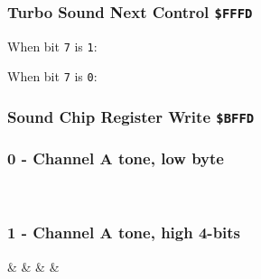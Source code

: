 \documentclass[12pt,twoside,openright,a4paper]{book}
\begin{document}
\subsubsection{Turbo Sound Next Control {\tt \$FFFD}}

When bit {\tt 7} is {\tt 1}:

\begin{NextPort}
\end{NextPort}

When bit {\tt 7} is {\tt 0}:

\begin{NextPort}
\end{NextPort}


\subsubsection{Sound Chip Register Write {\tt \$BFFD}}

\begin{NextPort}
\end{NextPort}

\begingroup
	\small
	\vspace*{8pt}					%
	\setlength{\leftskip}{1.25cm}	%

	\newcommand{\AYRegTitle}[1]{
		\subsubsection{#1}
		\vspace*{-1ex}
	}

	\begin{multicols}{2}
		\AYRegTitle{0 - Channel A tone, low byte}
		\begin{BitTableByte}
			 \\
		\end{BitTableByte}
		
		\AYRegTitle{1 - Channel A tone, high 4-bits}
		\begin{BitTableByte}
			\BitMono{0} &  &  &  & \BitMulti{4}{A tone high} \\
		\end{BitTableByte}		
	\end{multicols}
\end{document}
